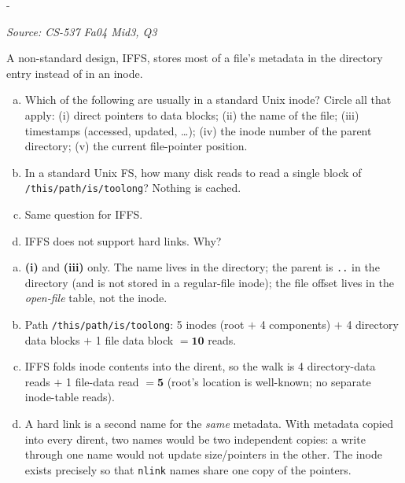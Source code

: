 \documentclass[11pt,a4paper]{article}
\makeatletter
\newcommand{\keepspace}[1]{\par\penalty-100\begingroup
  \setlength{\dimen@}{#1}\dimen@ii\pagegoal\advance\dimen@ii-\pagetotal
  \ifdim\dimen@>\dimen@ii\ifdim\dimen@ii>\z@\vfil\fi\break\fi\endgroup}
\newcounter{qn}[section]
\newenvironment{Qn}[4]{%
  \refstepcounter{qn}\keepspace{7\baselineskip}%
  \begin{tcolorbox}[qboxstyle, title={Q\thesection.\theqn\ \ [#1 \textbar\ #2]\ \ #4}]%
  {\footnotesize\color{g3}\textit{Source: #3}}\par\smallskip%
}{%
  \end{tcolorbox}%
}
\newenvironment{Sol}{%
  \begin{tcolorbox}[sboxstyle, title={Solution}]%
}{%
  \end{tcolorbox}\vspace{0.35em}%
}
\makeatother
\begin{document}
\begin{Qn}{Medium-Hard}{Lect 23--24}{CS-537 Fa04 Mid3, Q3}{Inode-free FS vs Unix: path I/O and hard links}
A non-standard design, IFFS, stores most of a file's metadata in the
directory entry instead of in an inode.
\begin{enumerate}[(a)]
\item Which of the following are usually in a standard Unix inode?
      Circle all that apply:
      (i) direct pointers to data blocks;
      (ii) the name of the file;
      (iii) timestamps (accessed, updated, \ldots);
      (iv) the inode number of the parent directory;
      (v) the current file-pointer position.
\item In a standard Unix FS, how many disk reads to read a single block
      of \texttt{/this/path/is/toolong}? Nothing is cached.
\item Same question for IFFS.
\item IFFS does not support hard links. Why?
\end{enumerate}
\end{Qn}
\begin{Sol}
\begin{enumerate}[(a)]
\item \textbf{(i)} and \textbf{(iii)} only. The name lives in the
      directory; the parent is \texttt{..} in the directory (and is
      not stored in a regular-file inode); the file offset lives in
      the \emph{open-file} table, not the inode.
\item Path \texttt{/this/path/is/toolong}: 5 inodes (root $+$ 4
      components) $+$ 4 directory data blocks $+$ 1 file data block
      $= \mathbf{10}$ reads.
\item IFFS folds inode contents into the dirent, so the walk is 4
      directory-data reads $+$ 1 file-data read $= \mathbf{5}$
      (root's location is well-known; no separate inode-table reads).
\item A hard link is a second name for the \emph{same} metadata. With
      metadata copied into every dirent, two names would be two
      independent copies: a write through one name would not update
      size/pointers in the other. The inode exists precisely so that
      \texttt{nlink} names share one copy of the pointers.
\end{enumerate}
\end{Sol}
\end{document}
